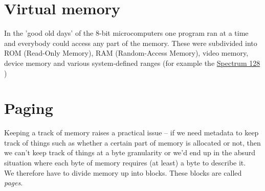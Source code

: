 \section{Virtual memory}

In the 'good old days' of the 8-bit microcomputers one program ran at a time and
everybody could access any part of the memory. These were subdivided into ROM
(Read-Only Memory), RAM (Random-Access Memory), video memory, device memory and
various system-defined ranges (for example the
\href{https://worldofspectrum.org/ZXSpectrum128+3Manual/chapter8pt24.html}{Spectrum
  128} \autocite{spectrum128-manual:c8pt24})\\

\section{Paging}

Keeping a track of memory raises a practical issue -- if we need metadata to
keep track of things such as whether a certain part of memory is allocated or
not, then we can't keep track of things at a byte granularity or we'd end up in
the absurd situation where each byte of memory requires (at least) a byte to
describe it.\\

We therefore have to divide memory up into blocks. These blocks are called
\emph{pages}.
